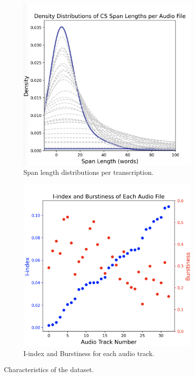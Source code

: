 \documentclass[11pt, a4paper]{report}
\begin{document}
\begin{figure}[h]
  \centering
  \begin{subfigure}[b]{0.45\textwidth}
    \includegraphics[width=\textwidth]{images/density_spans.png}
    \caption{Span length distributions per transcription.}
    \label{densities}
  \end{subfigure}
  \hfill
  \begin{subfigure}[b]{0.45\textwidth}
    \includegraphics[width=\textwidth]{images/metrics.png}
    \caption{I-index and Burstiness for each audio track.}
    \label{metrics}
  \end{subfigure}
  \caption{Characteristics of the dataset.}
  \label{fig:two_figs}
\end{figure}
\end{document}
